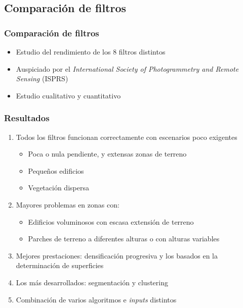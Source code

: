 \subsection{Comparación de filtros}
\begin{frame}
  \frametitle{Comparación de filtros}
    \begin{itemize}
      \item Estudio del rendimiento de los 8 filtros distintos 
      \item Auspiciado por el \emph{International Society of Photogrammetry and
        Remote Sensing} (\alert{ISPRS})
      \item Estudio cualitativo y cuantitativo
    \end{itemize}
\end{frame}
\begin{frame}
  \frametitle{Resultados}
  \begin{enumerate}
    \item Todos los filtros funcionan correctamente con escenarios poco exigentes
      \begin{itemize}
        \item Poca o nula pendiente, y extensas zonas de terreno
        \item Pequeños edificios
        \item Vegetación dispersa
      \end{itemize}
    \item Mayores problemas en zonas con:
      \begin{itemize}
        \item Edificios voluminosos con escasa extensión de terreno
        \item Parches de terreno a diferentes alturas o con alturas variables
      \end{itemize}
    \item<2-> Mejores prestaciones: \alert<2>{densificación progresiva} y los basados
      en la \alert<2>{determinación de superficies}
    \item<3-> Los más desarrollados: \alert<3>{segmentación y clustering}
    \item<4-> \alert<4>{Combinación} de varios algoritmos e \emph{inputs} distintos
  \end{enumerate}
\end{frame}
